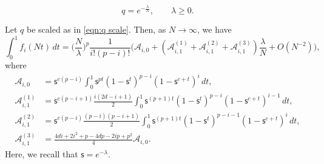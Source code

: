 \documentclass[10pt,a4paper]{amsart}
\begin{document}
    \begin{equation}\label{eqn:q scale}
    q=e^{-\frac{\lambda}{N}},\qquad \lambda\geq0.
\end{equation} 

\begin{lem}
    Let $q$ be scaled as in \eqref{eqn:q scale}. Then, as $N\rightarrow\infty$, we have
    \begin{equation}\label{eqn:intf(Nt) asymptotic}
        \int_{0}^{1}f_{i}(Nt)\,dt
        =\Big(\frac{N}{\lambda}\Big)^{p}\frac{1}{i!(p-i)!}\Big(\mathcal{A}_{i,0}+(\mathcal{A}_{i,1}^{(1)}+\mathcal{A}_{i,1}^{(2)}+\mathcal{A}_{i,1}^{(3)})\frac{\lambda}{N}+O(N^{-2})\Big), 
    \end{equation}
    where
        \begin{align} \label{def of mathcal Ai0}
        \mathcal{A}_{i,0}
        &=\mathsf{s}^{c(p-i)} \int_{0}^{1} \mathsf{s}^{pt}(1-\mathsf{s}^{t})^{p-i}(1-\mathsf{s}^{c+t})^{i}\,dt, 
        \\
        \mathcal{A}_{i,1}^{(1)} &=\mathsf{s}^{c(p-i+1)}\frac{i(2d-i+1)}{2}\int_{0}^{1}\mathsf{s}^{(p+1)t}(1-\mathsf{s}^{t})^{p-i}(1-\mathsf{s}^{c+t})^{i-1}\,dt,
        \\
        \mathcal{A}_{i,1}^{(2)} &=\mathsf{s}^{c(p-i)} \frac{(p-i)(p-i+1)}{2}\int_{0}^{1} \mathsf{s}^{(p+1)t}(1-\mathsf{s}^{t})^{p-i-1}(1-\mathsf{s}^{c+t})^{i}\,dt, 
        \\
        \mathcal{A}_{i,1}^{(3)} &=\frac{4di+2i^{2}+p-4dp-2ip+p^2}{4}\mathcal{A}_{i,0}. 
    \end{align}
Here, we recall that $\mathsf{s}=e^{-\lambda}.$   
\end{lem}
\end{document}
